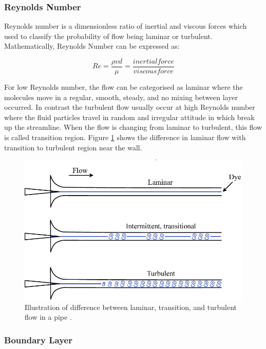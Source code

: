 \subsubsection{Reynolds Number}
Reynolds number is a dimensionless ratio of inertial and viscous forces which used to classify the probability of flow being laminar or turbulent\cite{Rehm2008SituationalMPD}. Mathematically, Reynolds Number can be expressed as:

\begin{equation}
Re = \frac{\rho v d}{\mu} = \frac{inertial force}{viscous force}
\end{equation}

\noindent For low Reynolds number, the flow can be categorised as laminar where the molecules move in a regular, smooth, steady, and no mixing between layer occurred\cite{Obidi2014TheoryVehicles}. In contrast the turbulent flow usually occur at high Reynolds number where the fluid particles travel in random and irregular attitude in which break up the streamline. When the flow is changing from laminar to turbulent, this flow is called transition region. Figure \ref{fig:2} shows the difference in laminar flow with transition to turbulent region near the wall. 

\begin{figure}[!ht]
    \centering
    \includegraphics[scale=0.4]{Figures/laminar_turbulent_difference.jpg}
    \caption{Illustration of difference between laminar, transition, and turbulent flow in a pipe \cite{D.BARKLE2016TheoreticalPipe}.}
    \label{fig:2}
\end{figure}

\subsubsection{Boundary Layer}


